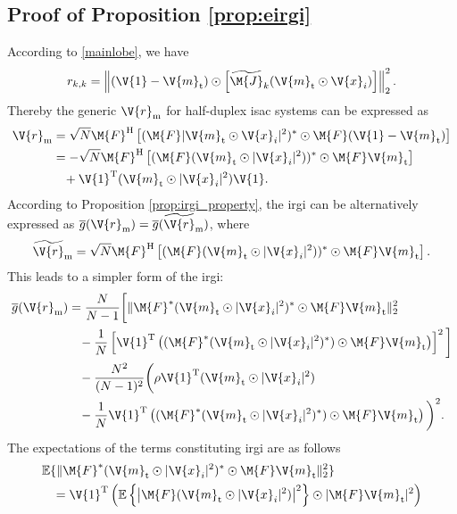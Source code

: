 \documentclass[journal,a4paper,10pt, romanappendices]{IEEEtran}
\begin{document}
\subsection{Proof of Proposition \ref{prop:eirgi}}\label{sec:proof_eirgi}
\begin{IEEEproof}
According to \eqref{mainlobe}, we have
$$
r_{k,k} = \left\|(\V{1}-\V{m}_{\rm t})\odot \left[\widetilde{\M{J}}_k(\V{m}_{\rm t}\odot\V{x}_i)\right]\right\|_2^2.
$$
Thereby the generic $\V{r}_{\rm m}$ for half-duplex \ac{isac} systems can be expressed as
\begin{align}
\V{r}_{\rm m} &= \sqrt{N}\M{F}^{\rm H}\left[(\M{F}|\V{m}_{\rm t}\odot\V{x}_i|^2)^\ast\odot \M{F}(\V{1}-\V{m}_{\rm t})\right]\nonumber\\
&=-\sqrt{N}\M{F}^{\rm H}\left[(\M{F}(\V{m}_{\rm t}\odot|\V{x}_i|^2))^\ast\odot \M{F}\V{m}_{\rm t}\right]\nonumber \\
&\hspace{3mm}+ \V{1}^{\rm T}(\V{m}_{\rm t}\odot |\V{x}_i|^2)\V{1}.
\end{align}
According to Proposition \ref{prop:irgi_property}, the \ac{irgi} can be alternatively expressed as $\overline{g}(\V{r}_{\rm m})=\overline{g}(\widetilde{\V{r}}_{\rm m})$, where
$$
\widetilde{\V{r}}_{\rm m} = \sqrt{N}\M{F}^{\rm H}\left[(\M{F}(\V{m}_{\rm t}\odot|\V{x}_i|^2))^\ast\odot \M{F}\V{m}_{\rm t}\right].
$$
This leads to a simpler form of the \ac{irgi}:
$$
\begin{aligned}
\overline{g}(\V{r}_{\rm m}) &= \frac{N}{N-1}\bigg[\|\M{F}^*(\V{m}_{\rm t}\odot|\V{x}_i|^2)^*\odot\M{F}\V{m}_{\rm t}\|_2^2\\
&\hspace{3mm}-\frac{1}{N}\left[\V{1}^{\rm T}\left((\M{F}^*(\V{m}_{\rm t}\odot|\V{x}_i|^2)^*)\odot \M{F}\V{m}_{\rm t}\right)\right]^2\bigg] \\
&\hspace{3mm}-\frac{N^2}{(N-1)^2} \bigg(\rho\V{1}^{\rm T}(\V{m}_{\rm t}\odot|\V{x}_i|^2)\\
&\hspace{3mm}-\frac{1}{N}\V{1}^{\rm T}\left((\M{F}^*(\V{m}_{\rm t}\odot|\V{x}_i|^2)^*)\odot \M{F}\V{m}_{\rm t}\right)\bigg)^2.
\end{aligned}
$$
The expectations of the terms constituting \ac{irgi} are as follows
\begin{align}
&\mathbb{E}\{\|\M{F}^*(\V{m}_{\rm t}\odot|\V{x}_i|^2)^*\odot\M{F}\V{m}_{\rm t}\|_2^2\}\nonumber\\
&\hspace{3mm}= \V{1}^{\rm T}\left(\mathbb{E}\left\{\left|\M{F}(\V{m}_{\rm t}\odot|\V{x}_i|^2)\right|^2\right\}\odot |\M{F}\V{m}_{\rm t}|^2\right)\nonumber\\

\end{align}
\end{IEEEproof}
\end{document}
